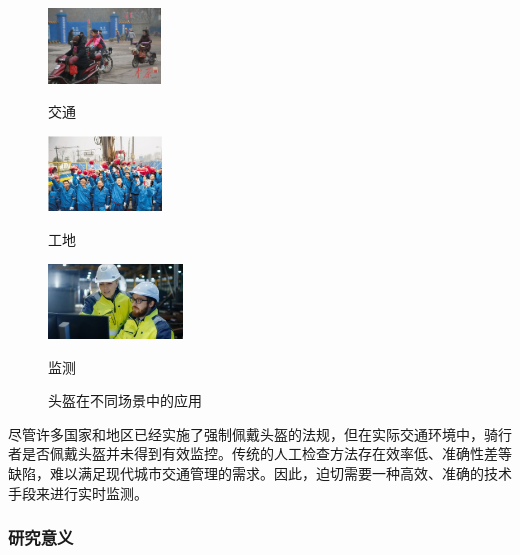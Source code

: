 \documentclass[journal]{IEEEtran}
\numberwithin{figure}{section}%
\numberwithin{table}{section}%
\numberwithin{equation}{section}
\begin{document}
\begin{figure}[h]
	
	\begin{minipage}{0.32\linewidth}
		\vspace{3pt}
		\centerline{\includegraphics[width=\textwidth,height=2cm]{figures/1_1.jpg}}
		\centerline{交通}
	\end{minipage}
	\begin{minipage}{0.32\linewidth}
		\vspace{3pt}
		\centerline{\includegraphics[width=\textwidth,height=2cm]{figures/1_2.jpg}}
	 
		\centerline{工地}
	\end{minipage}
	\begin{minipage}{0.32\linewidth}
		\vspace{3pt}
		\centerline{\includegraphics[width=\textwidth,height=2cm]{figures/1_3.jpg}}
	 
		\centerline{监测}
	\end{minipage}
 
	\caption{头盔在不同场景中的应用}
	\label{fig4}
\end{figure}

尽管许多国家和地区已经实施了强制佩戴头盔的法规，但在实际交通环境中，骑行者是否佩戴头盔并未得到有效监控。传统的人工检查方法存在效率低、准确性差等缺陷，难以满足现代城市交通管理的需求。因此，迫切需要一种高效、准确的技术手段来进行实时监测。
\subsubsection{研究意义}
\end{document}
